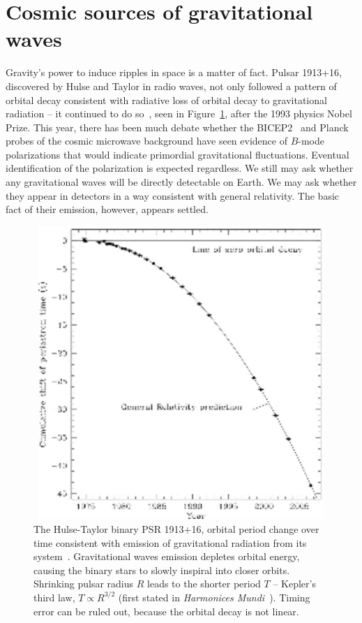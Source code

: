         
        \section{Cosmic sources of gravitational waves}
        \label{cosmic_sources}
      

		Gravity's power to induce ripples in space is a matter of fact. Pulsar 1913+16, discovered by Hulse and Taylor in radio waves, not only followed a pattern of orbital decay consistent with radiative loss of orbital decay to gravitational radiation -- it continued to do so~\cite{WeisbergTaylor2004,Weisberg2010}, seen in Figure~\ref{Hulse-Taylor_binary}, after the 1993 physics Nobel Prize. 
This year, there has been much debate whether the BICEP2~\cite{BICEP2014} and Planck~\cite{Planck2014} probes of the cosmic microwave background have seen evidence of $B$-mode polarizations that would indicate primordial gravitational fluctuations.
Eventual identification of the polarization is expected regardless. 
We still may ask whether any gravitational waves will be directly detectable on Earth. 
We may ask whether they appear in detectors in a way consistent with general relativity. 
The basic fact of their emission, however, appears settled.

	\begin{figure}
	\begin{center}
	\includegraphics[height=111mm, width=148mm]{500px-PSR_B1913+16_period_shift_graph.eps}
	\caption{The Hulse-Taylor binary PSR 1913+16, orbital period change over time consistent with emission of gravitational radiation from its system~\cite{Weisberg2010}. Gravitational waves emission depletes orbital energy, causing the binary stars to slowly inspiral into closer orbits. Shrinking pulsar radius $R$ leads to the shorter period $T$ -- Kepler's third law, $T \propto R^{3/2}$ (first stated in \textit{Harmonices Mundi}~\cite{Hawking2002}). Timing error can be ruled out, because the orbital decay is not linear.}
	\label{Hulse-Taylor_binary}
	\end{center}
	\end{figure}

